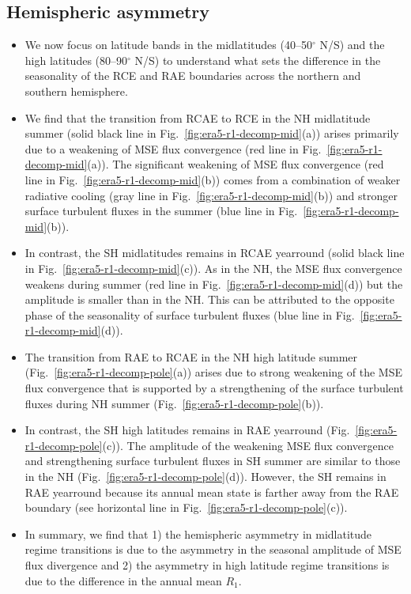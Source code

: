 \documentclass{ametsocV5}
\begin{document}
\subsection{Hemispheric asymmetry} \label{subsec:asym}
\begin{itemize}
  \item We now focus on latitude bands in the midlatitudes (40--50$^{\circ}$ N/S) and the high latitudes (80--90$^{\circ}$ N/S) to understand what sets the difference in the seasonality of the RCE and RAE boundaries across the northern and southern hemisphere.
  \item We find that the transition from RCAE to RCE in the NH midlatitude summer (solid black line in Fig.~\ref{fig:era5-r1-decomp-mid}(a)) arises primarily due to a weakening of MSE flux convergence (red line in Fig.~\ref{fig:era5-r1-decomp-mid}(a)). The significant weakening of MSE flux convergence (red line in Fig.~\ref{fig:era5-r1-decomp-mid}(b)) comes from a combination of weaker radiative cooling (gray line in Fig.~\ref{fig:era5-r1-decomp-mid}(b)) and stronger surface turbulent fluxes in the summer (blue line in Fig.~\ref{fig:era5-r1-decomp-mid}(b)).
  \item In contrast, the SH midlatitudes remains in RCAE yearround (solid black line in Fig.~\ref{fig:era5-r1-decomp-mid}(c)). As in the NH, the MSE flux convergence weakens during summer (red line in Fig.~\ref{fig:era5-r1-decomp-mid}(d)) but the amplitude is smaller than in the NH. This can be attributed to the opposite phase of the seasonality of surface turbulent fluxes (blue line in Fig.~\ref{fig:era5-r1-decomp-mid}(d)).
  \item The transition from RAE to RCAE in the NH high latitude summer (Fig.~\ref{fig:era5-r1-decomp-pole}(a)) arises due to strong weakening of the MSE flux convergence that is supported by a strengthening of the surface turbulent fluxes during NH summer (Fig.~\ref{fig:era5-r1-decomp-pole}(b)).
  \item In contrast, the SH high latitudes remains in RAE yearround (Fig.~\ref{fig:era5-r1-decomp-pole}(c)). The amplitude of the weakening MSE flux convergence and strengthening surface turbulent fluxes in SH summer are similar to those in the NH (Fig.~\ref{fig:era5-r1-decomp-pole}(d)). However, the SH remains in RAE yearround because its annual mean state is farther away from the RAE boundary (see horizontal line in Fig.~\ref{fig:era5-r1-decomp-pole}(c)).
  \item In summary, we find that 1) the hemispheric asymmetry in midlatitude regime transitions is due to the asymmetry in the seasonal amplitude of MSE flux divergence and 2) the asymmetry in high latitude regime transitions is due to the difference in the annual mean $R_{1}$.
\end{itemize}
\end{document}
